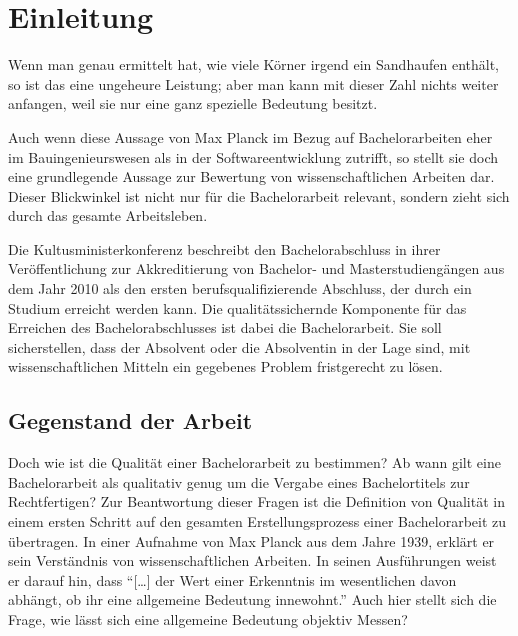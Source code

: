 
\chapter{Einleitung}
\begin{displayquote}
    Wenn man genau ermittelt hat, wie viele Körner irgend ein Sandhaufen enthält, so ist das eine ungeheure Leistung; aber man kann mit dieser Zahl nichts weiter anfangen, weil sie nur eine ganz spezielle Bedeutung besitzt.
\end{displayquote}

Auch wenn diese Aussage von Max Planck im Bezug auf Bachelorarbeiten eher im Bauingenieurswesen als in der Softwareentwicklung zutrifft, so stellt sie doch eine grundlegende Aussage zur Bewertung von wissenschaftlichen Arbeiten dar. Dieser Blickwinkel ist nicht nur für die Bachelorarbeit relevant, sondern zieht sich durch das gesamte Arbeitsleben. 

Die Kultusministerkonferenz beschreibt den Bachelorabschluss in ihrer Veröffentlichung zur Akkreditierung von Bachelor- und Masterstudiengängen aus dem Jahr 2010 als den ersten berufsqualifizierende Abschluss, der durch ein Studium erreicht werden kann. Die qualitätssichernde Komponente für das Erreichen des Bachelorabschlusses ist dabei die Bachelorarbeit. Sie soll sicherstellen, dass der Absolvent oder die Absolventin in der Lage sind, mit wissenschaftlichen Mitteln ein gegebenes Problem fristgerecht zu lösen.\cite[Vgl.][S.4]{kmk:2010}



\section{Gegenstand der Arbeit}
Doch wie ist die Qualität einer Bachelorarbeit zu bestimmen? Ab wann gilt eine Bachelorarbeit als qualitativ genug um die Vergabe eines Bachelortitels zur Rechtfertigen? Zur Beantwortung dieser Fragen ist die Definition von Qualität in einem ersten Schritt auf den gesamten Erstellungsprozess einer Bachelorarbeit zu übertragen. 
In einer Aufnahme von Max Planck aus dem Jahre 1939, erklärt er sein Verständnis von wissenschaftlichen Arbeiten. In seinen Ausführungen weist er darauf hin, dass \enquote{[…] der Wert einer Erkenntnis im wesentlichen davon abhängt, ob ihr eine allgemeine Bedeutung innewohnt.}\cite{Herneck:1976}
Auch hier stellt sich die Frage, wie lässt sich eine allgemeine Bedeutung objektiv Messen? 

